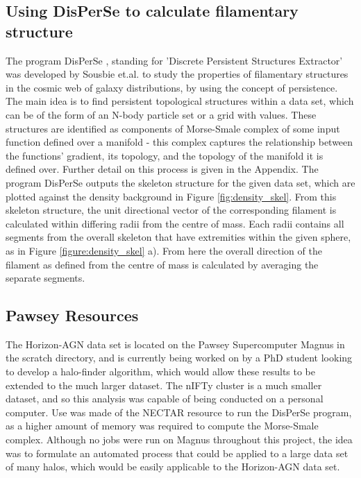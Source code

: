 \documentclass[journal]{IEEEtran}
\begin{document}
\subsection{Using DisPerSe to calculate filamentary structure}
The program DisPerSe \cite{sousbie11a}, standing for 'Discrete Persistent Structures Extractor' was developed by Sousbie et.al. to study the properties of filamentary structures in the cosmic web of galaxy distributions, by using the concept of persistence. The main idea is to find persistent topological structures within a data set, which can be of the form of an N-body particle set or a grid with values. These structures are identified as components of Morse-Smale complex of some input function defined over a manifold - this complex captures the relationship between the functions' gradient, its topology, and the topology of the manifold it is defined over. Further detail on this process is given in the Appendix.
The program DisPerSe outputs the skeleton structure for the given data set, which are plotted against the density background in Figure \ref{fig:density_skel}. From this skeleton structure, the unit directional vector of the corresponding filament is calculated within differing radii from the centre of mass. Each radii contains all segments from the overall skeleton that have extremities within the given sphere, as in Figure \ref{figure:density_skel} a). From here the overall direction of the filament as defined from the centre of mass is calculated by averaging the separate segments.
\subsection{Pawsey Resources}
The Horizon-AGN data set is located on the Pawsey Supercomputer Magnus in the scratch directory, and is currently being worked on by a PhD student looking to develop a halo-finder algorithm, which would allow these results to be extended to the much larger dataset. The nIFTy cluster is a much smaller dataset, and so this analysis was capable of being conducted on a personal computer. Use was made of the NECTAR resource to run the DisPerSe program, as a higher amount of memory was required to compute the Morse-Smale complex. Although no jobs were run on Magnus throughout this project, the idea was to formulate an automated process that could be applied to a large data set of many halos, which would be easily applicable to the Horizon-AGN data set. 
\end{document}
